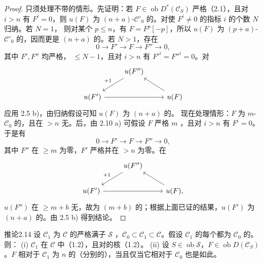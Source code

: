 \begin{proof}
只须处理不带的情形。先证明：若 $F\in\operatorname{ob}D^*(\mathscr C_S)$ 严格（2.1），且对 $i>n$ 有 $F^i=0$，则 $u(F)$ 为 $(n+a)$-$\mathscr C'_0$ 的。对使 $F^i\ne0$ 的指标 $i$ 的个数 $N$ 归纳。若 $N=1$，
则对某个 $p\leq n$，有 $F=F^p[-p]$，所以 $u(F)$ 为 $(p+a)$-$\mathscr C'_0$ 的，因而更是 $(n+a)$ 的。若 $N>1$，存在
\[0\longrightarrow F'\longrightarrow F\longrightarrow F''\longrightarrow0,\]
其中 $F',F''$ 均严格， $\leq N-1$，且对 $i>n$ 有 $F'^i=F''^i=0$。对
\[\begin{tikzcd}&u(F'')\arrow[dl,"+1"']&\\u(F')\arrow[rr]&&u(F)\arrow[ul]\end{tikzcd}\]
应用 2.5 b)，由归纳假设可知 $u(F)$ 为 $(n+a)$ 的。
现在处理情形：$F$ 为 $m$-$\mathscr C_0$ 的，且在 $>n$ 无。后，由 2.10 a) 可假设 $F$ 严格 $m$ ，且对 $i>n$ 有 $F^i=0$。于是有
\[0\longrightarrow F'\longrightarrow F\longrightarrow F''\longrightarrow0,\]
其中 $F''$ 在 $\geq m$ 为零，$F'$ 严格并在 $>n$ 为零。在
\[\begin{tikzcd}&u(F'')\arrow[dl,"+1"']&\\u(F')\arrow[rr]&&u(F)\arrow[ul],\end{tikzcd}\]
$u(F'')$ 在 $\geq m+b$ 无，故为 $(m+b)$ 的；根据上面已证的结果，$u(F')$ 为 $(n+a)$ 的。由 2.5 b) 得到结论。
\end{proof}
\begin{SGAresult}{推论}{2.14}
设 $\mathscr C_1$ 为 $\mathscr C$ 的严格满子 $\mathscr S$ ，$\mathscr C_0\subset\mathscr C_1\subset\mathscr C$。假设 $\mathscr C_1$ 的每个都为 $\mathscr C_0$ 的。
则：
(i) $\mathscr C_1$ 在 $\mathscr C$ 中（1.2），且对的核（1.2）。
(ii) 设 $S\in\operatorname{ob}\mathscr S$，$F\in\operatorname{ob}D(\mathscr C_S)$。$F$ 相对于 $\mathscr C_1$ 为 $n$ 的（分别的），当且仅当它相对于 $\mathscr C_0$ 也是如此。
\end{SGAresult}
